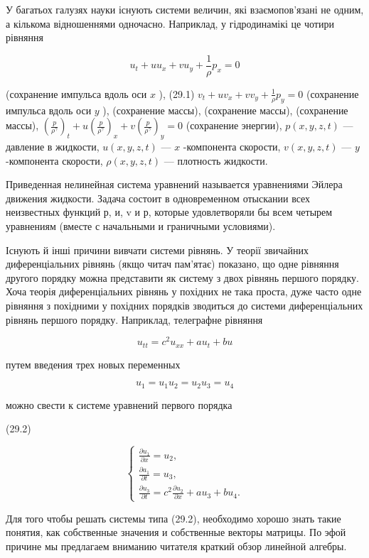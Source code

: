 \documentclass[
  ukrainian,
]{article}
\begin{document}
У багатьох галузях науки існують системи величин, які взаємопов'язані не
одним, а кількома відношеннями одночасно. Наприклад, у гідродинамікі це
чотири рівняння

\[
u_t + uu_x + vu_y + \frac{1}{\rho} p_x = 0
\]

(сохранение импульса вдоль оси \(x\) ), (29.1)
\(v_t + uv_x + vv_y + \frac{1}{\rho} p_y = 0\) (сохранение импульса
вдоль оси \(y\) ), (сохранение массы), (сохранение массы), (сохранение
массы),
\(\left(\frac{p}{\rho^{\gamma}}\right)_t + u\left(\frac{p}{\rho^{\gamma}}\right)_x + v\left(\frac{p}{\rho^{\gamma}}\right)_y = 0\)
(сохранение энергии), \(p(x, y, z, t)\) --- давление в жидкости,
\(u(x, y, z, t)\) --- \(x\) -компонента скорости, \(v(x, y, z, t)\) ---
\(y\) -компонента скорости, \(\rho(x, y, z, t)\) --- плотность жидкости.

Приведенная нелинейная система уравнений называется уравнениями Эйлера
движения жидкости. Задача состоит в одновременном отыскании всех
неизвестных функций р, и, v и р, которые удовлетворяли бы всем четырем
уравнениям (вместе с начальными и граничными условиями).

Існують й інші причини вивчати системи рівнянь. У теорії звичайних
диференціальних рівнянь (якщо читач пам'ятає) показано, що одне рівняння
другого порядку можна представити як систему з двох рівнянь першого
порядку. Хоча теорія диференціальних рівнянь у похідних не така проста,
дуже часто одне рівняння з похідними у похідних порядків зводиться до
системи диференціальних рівнянь першого порядку. Наприклад, телеграфне
рівняння

\[
u_{tt} = c^2 u_{xx} + a u_t + b u
\]

путем введения трех новых переменных

\[
u_1 = u_1
u_2 = u_2
u_3 = u_4
\]

можно свести к системе уравнений первого порядка

(29.2)

\[
\begin{cases} \frac{\partial u_1}{\partial x} = u_2, \\ \frac{\partial a_1}{\partial t} = u_3, \\ \frac{\partial u_3}{\partial t} = c^2 \frac{\partial u_2}{\partial x} + au_3 + bu_4. \end{cases}
\]

Для того чтобы решать системы типа (29.2), необходимо хорошо знать такие
понятия, как собственные значения и собственные векторы матрицы. По эфой
причине мы предлагаем вниманию читателя краткий обзор линейной алгебры.
\end{document}
